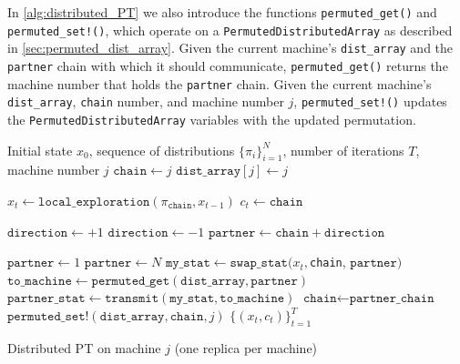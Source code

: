  
In \cref{alg:distributed_PT} we also introduce the functions 
\texttt{permuted\_get()} and \texttt{permuted\_set!()}, which operate 
on a  \texttt{PermutedDistributedArray} as described  in \cref{sec:permuted_dist_array}.
Given the current machine's \texttt{dist\_array} and the 
\texttt{partner} chain with which it should communicate, 
\texttt{permuted\_get()} returns the machine number that holds the \texttt{partner} chain. 
Given the current machine's \texttt{dist\_array}, \texttt{chain} number, and machine number $j$,
\texttt{permuted\_set!()} updates the \texttt{PermutedDistributedArray} variables 
with the updated permutation.

\begin{algorithm}[t]
\footnotesize
	\begin{algorithmic}[1]
    \Require Initial state $x_0$, sequence of distributions $\{\pi_i\}_{i=1}^N$, 
      number of iterations $T$, machine number $j$
    \State $\texttt{chain} \gets j$ 
    \State $\texttt{dist\_array}[j] \gets j$ 
		
    
     \State $x_t \gets \texttt{local\_exploration}(\pi_\texttt{chain}, x_{t-1})$
    \State $c_t \gets \texttt{chain}$ 
    
		    \State $\texttt{direction} \gets +1$
		  \Else
		    \State $\texttt{direction} \gets -1$
		  \EndIf
		  \State $\texttt{partner} \gets \texttt{chain} + \texttt{direction}$

     
        \State $\texttt{partner} \gets 1$ 
        \State $\texttt{partner} \gets N$
      \EndIf
	    \State $\texttt{my\_stat} \gets \texttt{swap\_stat}(x_t, $\texttt{chain}, $\texttt{partner} )$  
      \State $\texttt{to\_machine} \gets  \texttt{permuted\_get}(\texttt{dist\_array}, \texttt{partner})$
      \State $\texttt{partner\_stat} \gets \texttt{transmit}(\texttt{my\_stat}, \texttt{to\_machine})$
        \State $\texttt{chain} \gets \texttt{partner\_chain}$
      \EndIf
      \State $\texttt{permuted\_set!}(\texttt{dist\_array}, \texttt{chain}, j)$ 
		\EndFor
    \State \Return $\{(x_t, c_t)\}_{t=1}^T$
	\end{algorithmic}
  \caption{Distributed PT on machine $j$ (one replica per machine)}
  \label{alg:distributed_PT}
\end{algorithm}

